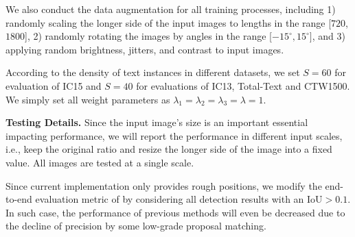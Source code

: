 \documentclass[letterpaper]{article} \usepackage{aaai21}  \usepackage{times}  \usepackage{helvet} \usepackage{courier}  \usepackage[hyphens]{url}  \usepackage{graphicx} \urlstyle{rm} \def\UrlFont{\rm}  \usepackage{natbib}  \usepackage{caption} \frenchspacing  \setlength{\pdfpagewidth}{8.5in}  \setlength{\pdfpageheight}{11in}  \usepackage{multirow}
\begin{document}
We also conduct the data augmentation for all training processes, including 1) randomly scaling the longer side of the input images to lengths in the range [$720$, $1800$], 2) randomly rotating the images by angles in the range [$-15^\circ, 15^\circ]$, and 3) applying random brightness, jitters, and contrast to input images.

According to the density of text instances in different datasets, we set $S$$=$$60$ for evaluation of IC15 and $S$$=$$40$ for evaluations of IC13, Total-Text and CTW1500.
We simply set all weight parameters as $\lambda_1$$=$$\lambda_2$$=$$\lambda_3$$=$$\lambda$$=$$1$.

\textbf{Testing Details.}
Since the input image's size is an important essential impacting performance, we will report the performance in different input scales, i.e., keep the original ratio and resize the longer side of the image into a fixed value.
All images are tested at a single scale.

Since current implementation only provides rough positions, we modify the end-to-end evaluation metric of \cite{2011End} by considering all detection results with an IoU$>$$0.1$.
In such case, the performance of previous methods will even be decreased due to the decline of precision by some low-grade proposal matching.
\end{document}
